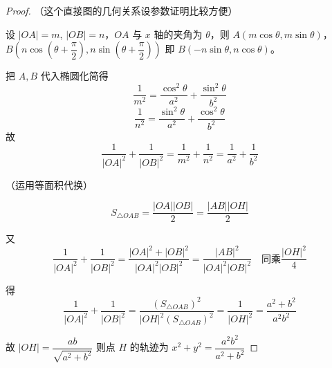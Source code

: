 \begin{proof}

（这个直接图的几何关系设参数证明比较方便）

设 $|OA| = m$, $|OB| = n$，$OA$ 与 $x$ 轴的夹角为 $\theta$，则 $A(m\cos\theta, m\sin\theta)$，$B\left(n\cos\left(\theta + \dfrac{\pi}{2}\right), n\sin\left(\theta + \dfrac{\pi}{2}\right)\right)$ 即 $B(-n\sin\theta, n\cos\theta)$。

把 $A, B$ 代入椭圆化简得
\[
\dfrac{1}{m^2} = \dfrac{\cos^2\theta}{a^2} + \dfrac{\sin^2\theta}{b^2}
\]
\[
\dfrac{1}{n^2} = \dfrac{\sin^2\theta}{a^2} + \dfrac{\cos^2\theta}{b^2}
\]
故
\[
\dfrac{1}{|OA|^2} + \dfrac{1}{|OB|^2} = \dfrac{1}{m^2} + \dfrac{1}{n^2} = \dfrac{1}{a^2} + \dfrac{1}{b^2}
\]

（运用等面积代换）

\[
S_{\triangle OAB} = \dfrac{|OA||OB|}{2} = \dfrac{|AB||OH|}{2}
\]

又
\[
\dfrac{1}{|OA|^2} + \dfrac{1}{|OB|^2} = \dfrac{|OA|^2 + |OB|^2}{|OA|^2|OB|^2} = \dfrac{|AB|^2}{|OA|^2|OB|^2} \quad \text{同乘} \dfrac{|OH|^2}{4}
\]

得
\[
\dfrac{1}{|OA|^2} + \dfrac{1}{|OB|^2} = \dfrac{(S_{\triangle OAB})^2}{|OH|^2 (S_{\triangle OAB})^2} = \dfrac{1}{|OH|^2} = \dfrac{a^2 + b^2}{a^2 b^2}
\]

故 $|OH| = \dfrac{ab}{\sqrt{a^2 + b^2}}$ 则点 $H$ 的轨迹为 $x^2 + y^2 = \dfrac{a^2 b^2}{a^2 + b^2}$


\end{proof}




\clearpage


\review

\clearpage

\hw
\begin{homework}
    
\end{homework}
\clearpage


